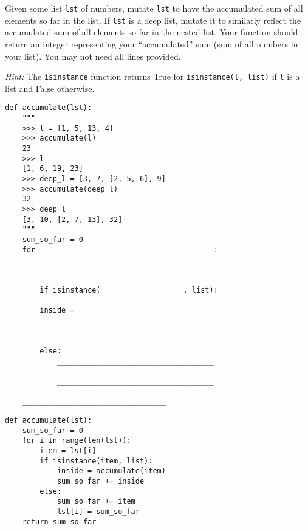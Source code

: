\begin{blocksection}
\question Given some list \lstinline{lst} of numbers, mutate \lstinline{lst} to have the accumulated sum of all elements so far in the list. If \lstinline{lst} is a deep list, mutate it to similarly reflect the accumulated sum of all elements so far in the nested list. Your function should return an integer representing your ``accumulated'' sum (sum of all numbers in your list). You may not need all lines provided.

\emph{Hint:} The \lstinline$isinstance$ function returns True for \lstinline$isinstance(l, list)$ if \texttt{l} is a list and False otherwise.

\begin{lstlisting}
def accumulate(lst):
    """
    >>> l = [1, 5, 13, 4]
    >>> accumulate(l)
    23
    >>> l
    [1, 6, 19, 23]
    >>> deep_l = [3, 7, [2, 5, 6], 9]
    >>> accumulate(deep_l)
    32
    >>> deep_l
    [3, 10, [2, 7, 13], 32]
    """
    sum_so_far = 0
    for ________________________________________:

	    ________________________________________

        if isinstance(___________________, list):

	    inside = ___________________________

            ____________________________________

        else:
            ____________________________________

            ____________________________________
    
    _________________________________
\end{lstlisting}
\end{blocksection}

\begin{blocksection}
\begin{solution}[1in]
\begin{lstlisting}
def accumulate(lst):
    sum_so_far = 0
    for i in range(len(lst)):
        item = lst[i]
        if isinstance(item, list):
            inside = accumulate(item)
            sum_so_far += inside
        else:
            sum_so_far += item
            lst[i] = sum_so_far
    return sum_so_far
\end{lstlisting}
\end{solution}
\end{blocksection}


